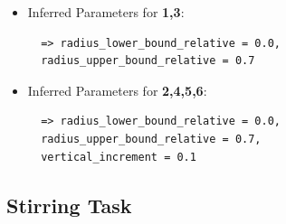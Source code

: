 \begin{itemize}
\item Inferred Parameters for \textbf{1,3}: 
 \begin{lstlisting}
  => radius_lower_bound_relative = 0.0, 
  radius_upper_bound_relative = 0.7
\end{lstlisting}
\item Inferred Parameters for \textbf{2,4,5,6}:
\begin{lstlisting}
  => radius_lower_bound_relative = 0.0, 
  radius_upper_bound_relative = 0.7,
  vertical_increment = 0.1
\end{lstlisting}
\end{itemize}

\subsection{Stirring Task}

